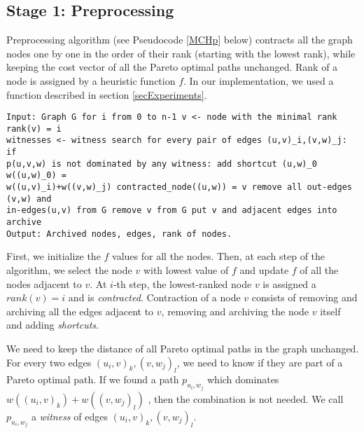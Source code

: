 

\subsection{Stage 1: Preprocessing} \label{subsecStage1}

Preprocessing algorithm (see Pseudocode \ref{MCHp} below) contracts all the
graph nodes one by one in the order of their rank (starting with the lowest
rank), while keeping the cost vector of all the Pareto optimal paths unchanged.
Rank of a node is assigned by a heuristic function $f$. In our implementation,
we used a function described in section \ref{secExperiments}.

\renewcommand{\lstlistingname}{Pseudocode MCHp}
\begin{lstlisting}[caption={MCHp},label=MCHp,captionpos=t,float,abovecaptionskip=-\medskipamount]
Input: Graph G for i from 0 to n-1 v <- node with the minimal rank rank(v) = i
witnesses <- witness search for every pair of edges (u,v)_i,(v,w)_j: if
p(u,v,w) is not dominated by any witness: add shortcut (u,w)_0 w((u,w)_0) =
w((u,v)_i)+w((v,w)_j) contracted_node((u,w)) = v remove all out-edges (v,w) and
in-edges(u,v) from G remove v from G put v and adjacent edges into archive
Output: Archived nodes, edges, rank of nodes.  \end{lstlisting}

First, we initialize the $f$ values for all the nodes. Then, at each step of
the algorithm, we select the node $v$ with lowest value of $f$ and update $f$
of all the nodes adjacent to $v$.  At $i$-th step, the lowest-ranked node $v$
is assigned a $rank(v) = i$ and is \emph{contracted}.  Contraction of a node
$v$ consists of removing and archiving all the edges adjacent to $v$, removing
and archiving the node $v$ itself and adding {\em shortcuts}. 

We need to keep the distance of all Pareto optimal paths in the graph
unchanged. For every two edges $(u_i,v)_k,(v,w_j)_l$, we need to know if they
are part of a Pareto optimal path. If we found a path $p_{u_i,w_j}$ which
dominates $w((u_i,v)_k)+w((v,w_j)_l)$ , then the combination is not needed. We
call $p_{u_i,w_j}$ a \emph{witness} of edges $(u_i,v)_k,(v,w_j)_l$. 

